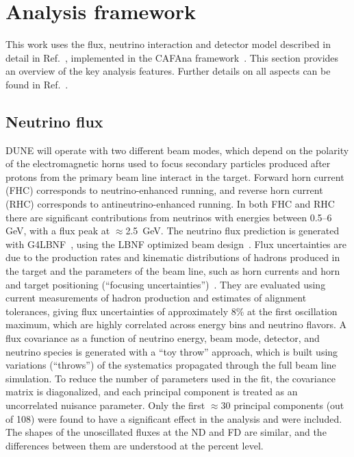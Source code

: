 \section{Analysis framework}
\label{sec:analysis_framework}
This work uses the flux, neutrino interaction and detector model described in detail in Ref.~\cite{Abi:2020qib}, implemented in the CAFAna framework~\cite{CAFAna}. This section provides an overview of the key analysis features. Further details on all aspects can be found in Ref.~\cite{Abi:2020qib}.

\subsection{Neutrino flux}
DUNE will operate with two different beam modes, which depend on the polarity of the electromagnetic horns used to focus secondary particles produced after protons from the primary beam line interact in the target. Forward horn current (FHC) corresponds to neutrino-enhanced running, and reverse horn current (RHC) corresponds to antineutrino-enhanced running. In both FHC and RHC there are significant contributions from neutrinos with energies between 0.5--6 GeV, with a flux peak at $\approx$2.5~GeV. The neutrino flux prediction is generated with G4LBNF~\cite{Aliaga:2016oaz,Abi:2020evt}, using the LBNF optimized beam design~\cite{Abi:2020evt}. Flux uncertainties are due to the production rates and kinematic distributions of hadrons produced in the target and the parameters of the beam line, such as horn currents and horn and target positioning (``focusing uncertainties'')~\cite{Abi:2020evt}. They are evaluated using current measurements of hadron production and estimates of alignment tolerances, giving flux uncertainties of approximately 8\% at the first oscillation maximum, which are highly correlated across energy bins and neutrino flavors. A flux covariance as a function of neutrino energy, beam mode, detector, and neutrino species is generated with a ``toy throw'' approach, which is built using variations (``throws'') of the systematics propagated through the full beam line simulation. To reduce the number of parameters used in the fit, the covariance matrix is diagonalized, and each principal component is treated as an uncorrelated nuisance parameter. Only the first $\approx$30 principal components (out of 108) were found to have a significant effect in the analysis and were included. The shapes of the unoscillated fluxes at the ND and FD are similar, and the differences between them are understood at the percent level.

